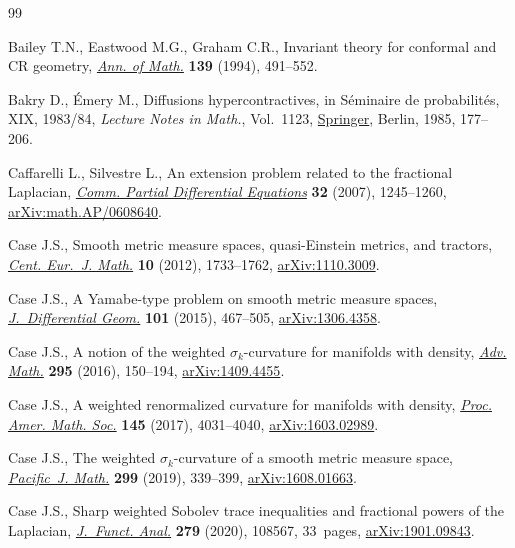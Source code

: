 \begin{thebibliography}{99}
\footnotesize\itemsep=-1pt

Bailey T.N., Eastwood M.G., Graham C.R., Invariant theory for conformal and
 {CR} geometry, \href{https://doi.org/10.2307/2118571}{\textit{Ann. of Math.}} \textbf{139} (1994), 491--552.

Bakry D., \'Emery M., Diffusions hypercontractives, in S\'eminaire de
 probabilit\'es, {XIX}, 1983/84, \textit{Lecture Notes in Math.}, Vol.~1123,
 \href{https://doi.org/10.1007/BFb0075847}{Springer}, Berlin, 1985, 177--206.

Caffarelli L., Silvestre L., An extension problem related to the fractional
 {L}aplacian, \href{https://doi.org/10.1080/03605300600987306}{\textit{Comm. Partial Differential Equations}} \textbf{32}
 (2007), 1245--1260, \href{https://arxiv.org/abs/math.AP/0608640}{arXiv:math.AP/0608640}.

Case J.S., Smooth metric measure spaces, quasi-{E}instein metrics, and
 tractors, \href{https://doi.org/10.2478/s11533-012-0091-x}{\textit{Cent. Eur.~J. Math.}} \textbf{10} (2012), 1733--1762,
 \href{https://arxiv.org/abs/1110.3009}{arXiv:1110.3009}.

Case J.S., A {Y}amabe-type problem on smooth metric measure spaces,
 \href{https://doi.org/10.4310/jdg/1445518921}{\textit{J.~Differential Geom.}} \textbf{101} (2015), 467--505,
 \href{https://arxiv.org/abs/1306.4358}{arXiv:1306.4358}.

Case J.S., A notion of the weighted {$\sigma_k$}-curvature for manifolds with
 density, \href{https://doi.org/10.1016/j.aim.2016.03.010}{\textit{Adv. Math.}} \textbf{295} (2016), 150--194,
 \href{https://arxiv.org/abs/1409.4455}{arXiv:1409.4455}.

Case J.S., A weighted renormalized curvature for manifolds with density,
 \href{https://doi.org/10.1090/proc/13566}{\textit{Proc. Amer. Math. Soc.}} \textbf{145} (2017), 4031--4040,
 \href{https://arxiv.org/abs/1603.02989}{arXiv:1603.02989}.

Case J.S., The weighted {$\sigma_k$}-curvature of a smooth metric measure
 space, \href{https://doi.org/10.2140/pjm.2019.299.339}{\textit{Pacific~J. Math.}} \textbf{299} (2019), 339--399,
 \href{https://arxiv.org/abs/1608.01663}{arXiv:1608.01663}.

Case J.S., Sharp weighted {S}obolev trace inequalities and fractional powers of
 the {L}aplacian, \href{https://doi.org/10.1016/j.jfa.2020.108567}{\textit{J.~Funct. Anal.}} \textbf{279} (2020), 108567, 33~pages,
 \href{https://arxiv.org/abs/1901.09843}{arXiv:1901.09843}.


\end{thebibliography}
